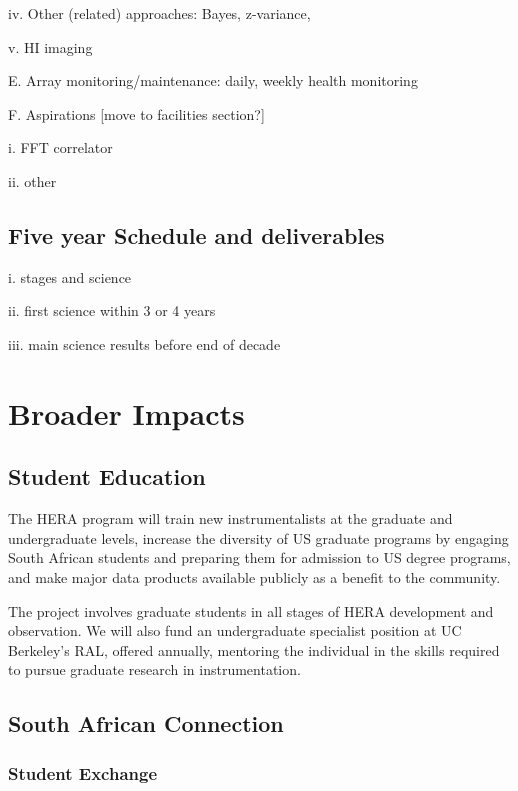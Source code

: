 \documentclass[preprint]{aastex}
\begin{document}
iv. Other (related) approaches: Bayes, z-variance,

v. HI imaging

E. Array monitoring/maintenance: daily, weekly health monitoring

F. Aspirations [move to facilities section?]

i. FFT correlator

ii. other

\subsection{Five year Schedule and deliverables} %

i. stages and science

ii. first science within 3 or 4 years

iii. main science results before end of decade


\section{Broader Impacts} %

\subsection{Student Education}

The HERA program will train new instrumentalists at the graduate and undergraduate levels, increase the
diversity of US graduate programs by engaging South African students and preparing them for admission to US degree programs, and make major data products available publicly as a benefit to the community.

The project involves graduate students in all stages of HERA development and observation. We will also fund an
undergraduate specialist position at UC Berkeley's RAL, offered annually, mentoring the individual in the skills required to pursue graduate research in instrumentation.

\subsection{South African Connection}

\subsubsection{Student Exchange}
\end{document}

